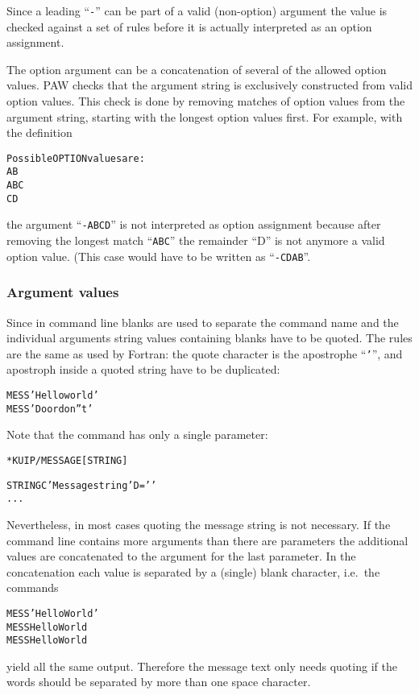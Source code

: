 Since a leading ``\texttt{-}'' can be part of a valid (non-option)
argument the value is checked against a set of rules before it is
actually interpreted as an option assignment.

The option argument can be a concatenation of several of the allowed
option values.
PAW checks that the argument string is exclusively constructed from
valid option values.
This check is done by removing matches of option values from the
argument string, starting with the longest option values first.
For example, with the definition
\begin{alltt}
   Possible OPTION values are:
    AB
    ABC
    CD
\end{alltt}
the argument ``\texttt{-ABCD}'' is not interpreted as option
assignment because after removing the longest match ``\texttt{ABC}''
the remainder ``D'' is not anymore a valid option value.
(This case would have to be written as ``\texttt{-CDAB}''.

%
%
\subsubsection{Argument values}

Since in command line blanks are used to separate the command name and the 
individual arguments string values containing blanks have to be quoted. The 
rules are the same as used by Fortran: the quote character is the apostrophe
``\texttt{'}'', and apostroph inside a quoted string have to be duplicated:

\begin{alltt}
MESS 'Hello world'
MESS 'Do or don''t'
\end{alltt}

Note that the  command has only a single parameter:
\begin{alltt}
 * KUIP/MESSAGE [ STRING ]

   STRING     C 'Message string' D=' '
...
\end{alltt}
Nevertheless, in most cases quoting the message string is not necessary. If the 
command line contains more arguments than there are parameters the additional 
values are concatenated to the argument for the last parameter. In the 
concatenation each value is separated by a (single) blank character, i.e.\ 
the commands

\begin{alltt}
MESS 'Hello World'
MESS  Hello World
MESS  Hello       World
\end{alltt}
yield all the same output. Therefore the message text only needs quoting if the 
words should be separated by more than one space character.

